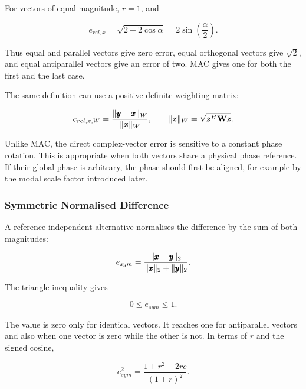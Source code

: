 For vectors of equal magnitude, $r=1$, and

\begin{equation}
    e_{rel,x}
    =\sqrt{2-2\cos\alpha}
    =2\sin\left(\frac{\alpha}{2}\right).
\end{equation}

Thus equal and parallel vectors give zero error, equal orthogonal vectors give
$\sqrt{2}$, and equal antiparallel vectors give an error of two. MAC gives one
for both the first and the last case.

The same definition can use a positive-definite weighting matrix:

\begin{equation}
    e_{rel,x,W}
    =
    \frac{\| {\pmb{y}-\pmb{x}} \|_W}{\| {\pmb{x}} \|_W},
    \qquad
    \| {\pmb{z}} \|_W
    =\sqrt{\pmb{z}^{H}\mathbf{W}\pmb{z}}.
\end{equation}

Unlike MAC, the direct complex-vector error is sensitive to a constant phase
rotation. This is appropriate when both vectors share a physical phase
reference. If their global phase is arbitrary, the phase should first be
aligned, for example by the modal scale factor introduced later.

\subsubsection{Symmetric Normalised Difference}

A reference-independent alternative normalises the difference by the sum of
both magnitudes:

\begin{bbox}
    \begin{equation}\label{symmetric-normalised-vector-difference}
        e_{sym}
        =
        \frac{\| {\pmb{x}-\pmb{y}} \|_2}
        {\| {\pmb{x}} \|_2+\| {\pmb{y}} \|_2}.
    \end{equation}
\end{bbox}

The triangle inequality gives

\begin{equation}
    0\leq e_{sym}\leq1.
\end{equation}

The value is zero only for identical vectors. It reaches one for antiparallel
vectors and also when one vector is zero while the other is not. In terms of
$r$ and the signed cosine,

\begin{equation}\label{symmetric-error-angle-scale-relation}
    e_{sym}^{2}
    =
    \frac{1+r^2-2r c}{(1+r)^2}.
\end{equation}


